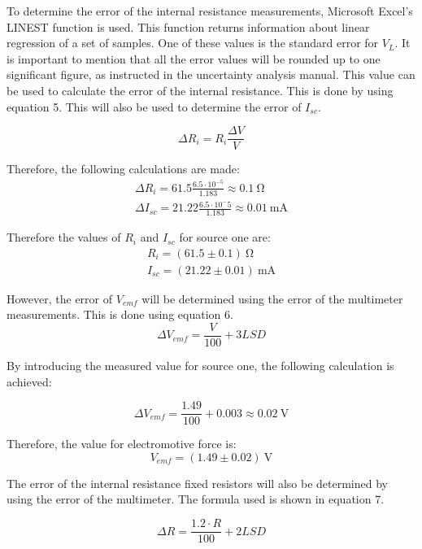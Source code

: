 \documentclass[a4paper]{article}
\newcommand{\unit}[1]{~\mathrm{#1}}
\begin{document}
To determine the error of the internal resistance measurements, Microsoft
Excel's LINEST function is used. This function returns information about linear
regression of a set of samples. One of these values is the standard error for
$V_{L}$. It is important to mention that all the error values will be rounded
up to one significant figure, as instructed in the uncertainty analysis manual\cite{DeneyerUncertainty}. This value can be used to calculate the error of the internal
resistance. This is done by using equation 5. This will also be used to determine the
error of $I_{sc}$. 

\begin{equation}
    \Delta R_i = R_i \frac{\Delta V}{V}
\end{equation}

Therefore, the following calculations are made:
\begin{gather*}
    \Delta R_i = 61.5 \frac{6.5 \cdot 10^{-5}}{1.183} \approx 0.1\unit{\Omega}\\
    \Delta I_{sc} = 21.22 \frac{6.5\cdot 10^-5}{1.183} \approx 0.01\unit{mA}
\end{gather*}

Therefore the values of $R_i$ and $I_{sc}$ for source one are:
\begin{gather*}
    R_i = (61.5\pm 0.1)\unit{\Omega}\\
    I_{sc} = (21.22 \pm 0.01)\unit{mA}
\end{gather*}

However, the error of $V_{emf}$ will be determined using the error of the
multimeter measurements\cite{multim}. This is done using equation 6.
\begin{equation}
    \Delta V_{emf} = \frac{V}{100} + 3 LSD
\end{equation}

By introducing the measured value for source one, the following calculation is
achieved:

\[ \Delta V_{emf} = \frac{1.49}{100} + 0.003 \approx 0.02 \unit{V}\]

Therefore, the value for electromotive force is:
\[V_{emf} = (1.49 \pm 0.02)\unit{V}\]

The error of the internal resistance fixed resistors will also be determined by
using the error of the multimeter. The formula used is shown in equation 7.

\begin{equation}
    \Delta R = \frac{1.2 \cdot R}{100} + 2LSD
\end{equation}
\end{document}

